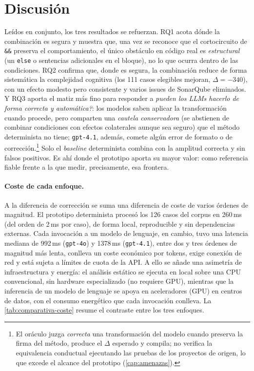 \section{Discusión}
Leídos en conjunto, los tres resultados se refuerzan. RQ1 acota dónde la
combinación es segura y muestra que, una vez se reconoce que el cortocircuito de
\lstinline|&&| preserva el comportamiento, el único obstáculo en código real es
\emph{estructural} (un \lstinline|else| o sentencias adicionales en el bloque),
no lo que ocurra dentro de las condiciones. RQ2 confirma que, donde es segura,
la combinación reduce de forma sistemática la complejidad cognitiva (los 111
casos elegibles mejoran, $\Delta=-340$), con un efecto modesto pero consistente
y varios issues de SonarQube eliminados. Y RQ3 aporta el matiz más fino para
responder a \emph{\textquestiondown{}pueden los LLMs hacerlo de forma correcta y
automática?}: los modelos saben aplicar la transformación cuando procede, pero
comparten una \emph{cautela conservadora} (se abstienen de combinar condiciones
con efectos colaterales aunque sea seguro) que el método determinista no tiene;
\texttt{gpt-4.1}, además, comete algún error de formato o de corrección.\footnote{El oráculo juzga
\emph{correcta} una transformación del modelo cuando preserva la firma del
método, produce el $\Delta$ esperado y compila; no verifica la equivalencia
conductual ejecutando las pruebas de los proyectos de origen, lo que excede el
alcance del prototipo (\autoref{cap:amenazas}).} Solo el
\emph{baseline} determinista combina con la amplitud correcta y sin falsos
positivos. Es ahí donde el prototipo aporta su mayor valor: como referencia
fiable frente a la que medir, precisamente, esa frontera.

\paragraph{Coste de cada enfoque.} A la diferencia de corrección se suma una
diferencia de coste de varios órdenes de magnitud. El prototipo determinista
procesó los 126 casos del corpus en 260\,ms (del orden de 2\,ms por caso),
de forma local, reproducible y sin dependencias externas. Cada invocación a un
modelo de lenguaje, en cambio, tuvo una latencia mediana de 992\,ms
(\texttt{gpt-4o}) y 1378\,ms (\texttt{gpt-4.1}), entre dos y tres órdenes de
magnitud más lenta, conlleva un coste económico por tokens, exige conexión de
red y está sujeta a límites de cuota de la API. A ello se añade una asimetría de
infraestructura y energía: el análisis estático se ejecuta en local sobre una
CPU convencional, sin hardware especializado (no requiere GPU), mientras que la
inferencia de un modelo de lenguaje se apoya en aceleradores (GPU) en centros de
datos, con el consumo energético que cada invocación conlleva. La
\autoref{tab:comparativa-coste} resume el contraste entre los tres enfoques.

